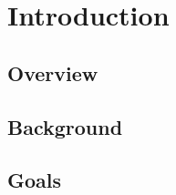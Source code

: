 \section{Introduction}
\label{sec:Introduction}

\subsection{Overview} 

\subsection{Background}


\subsection{Goals}
